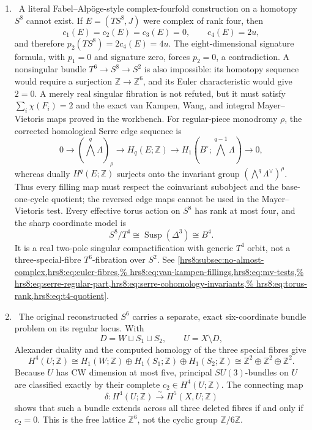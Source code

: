 \begin{enumerate}[leftmargin=1.8em]
\item \Refuted\ A literal Fabel--Alp\"oge-style complex-fourfold
construction on a homotopy \(S^8\) cannot exist.  If
\(E=(TS^8,J)\) were complex of rank four, then
\[
 c_1(E)=c_2(E)=c_3(E)=0,\qquad c_4(E)=2u,
\]
and therefore \(p_2(TS^8)=2c_4(E)=4u\).  The eight-dimensional signature
formula, with \(p_1=0\) and signature zero, forces \(p_2=0\), a
contradiction.  A nonsingular bundle
\(T^6\to S^8\to S^2\) is also impossible: its homotopy sequence would
require a surjection \(\mathbb Z\to\mathbb Z^6\), and its Euler
characteristic would give \(2=0\).  A merely real singular fibration is not
refuted, but it must satisfy
\(\sum_i\chi(F_i)=2\) and the exact van Kampen, Wang, and integral
Mayer--Vietoris maps proved in the workbench.  For regular-piece monodromy
\(\rho\), the corrected homological Serre edge sequence is
\[
 0\longrightarrow(\textstyle\bigwedge^q\Lambda)_\rho
 \longrightarrow H_q(E;\mathbb Z)
 \longrightarrow
 H_1(B^\circ;\textstyle\bigwedge^{q-1}\Lambda)
 \longrightarrow0,
\]
whereas dually \(H^q(E;\mathbb Z)\) surjects onto the invariant group
\((\bigwedge^q\Lambda^\vee)^\rho\).  Thus every filling map must respect
the coinvariant subobject and the base-one-cycle quotient; the reversed
edge maps cannot be used in the Mayer--Vietoris test.  Every effective torus
action on \(S^8\) has rank at most four, and the sharp coordinate model is
\[
 S^8/T^4\cong\operatorname{Susp}(\Delta^3)\cong B^4.
\]
It is a real two-pole singular compactification with generic \(T^4\) orbit,
not a three-special-fibre \(T^6\)-fibration over \(S^2\).  See
\cref{hrs8:subsec:no-almost-complex,hrs8:eq:euler-fibres,%
 hrs8:eq:van-kampen-fillings,hrs8:eq:mv-tests,%
 hrs8:eq:serre-regular-part,hrs8:eq:serre-cohomology-invariants,%
 hrs8:eq:torus-rank,hrs8:eq:t4-quotient}.

\item \Verified\ The original reconstructed \(S^6\) carries a separate,
exact six-coordinate bundle problem on its regular locus.  With
\[
 D=W\sqcup S_1\sqcup S_2,
 \qquad U=X\setminus D,
\]
Alexander duality and the computed homology of the three special fibres give
\[
 H^4(U;\mathbb Z)
 \cong H_1(W;\mathbb Z)\oplus H_1(S_1;\mathbb Z)
       \oplus H_1(S_2;\mathbb Z)
 \cong\mathbb Z^2\oplus\mathbb Z^2\oplus\mathbb Z^2.
\]
Because \(U\) has CW dimension at most five, principal \(SU(3)\)-bundles
on \(U\) are classified exactly by their complete
\(c_2\in H^4(U;\mathbb Z)\).  The connecting map
\[
 \delta:H^4(U;\mathbb Z)\xrightarrow{\sim}H^5(X,U;\mathbb Z)
\]
shows that such a bundle extends across all three deleted fibres if and only
if \(c_2=0\).  This is the free lattice \(\mathbb Z^6\), not the cyclic
group \(\mathbb Z/6\mathbb Z\).


\end{enumerate}
